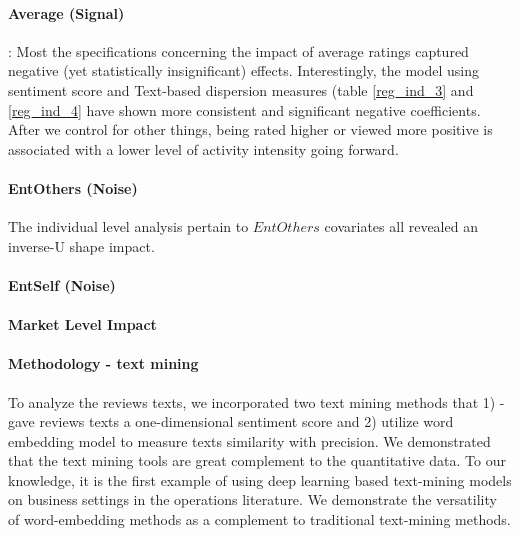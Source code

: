 \documentclass[msom,blindrev]{informs3}
\begin{document}
\paragraph{Average (Signal)} : Most the specifications concerning the impact of average ratings captured negative (yet statistically insignificant) effects.   Interestingly, the model using sentiment score and Text-based dispersion measures (table \ref{reg_ind_3} and \ref{reg_ind_4} have shown more consistent and significant negative coefficients. After we control for other things, being rated higher or viewed more positive is associated with a lower level of activity intensity going forward. \\

 

\paragraph{EntOthers (Noise)} The individual level analysis pertain to $EntOthers$ covariates all revealed an inverse-U shape impact. 
\paragraph{EntSelf (Noise)}

\paragraph{Market Level Impact} 

\paragraph{Methodology - text mining} To analyze the reviews texts, we incorporated two text mining methods that 1) - gave reviews texts a one-dimensional sentiment score and 2) utilize word embedding model to measure texts similarity with precision. We demonstrated that the text mining tools are great complement to the quantitative data. To our knowledge, it is the first example of using deep learning based text-mining models on business settings in the operations literature. We demonstrate the versatility of word-embedding methods as a complement to traditional text-mining methods. 


\clearpage
%
%
%
\end{document}
